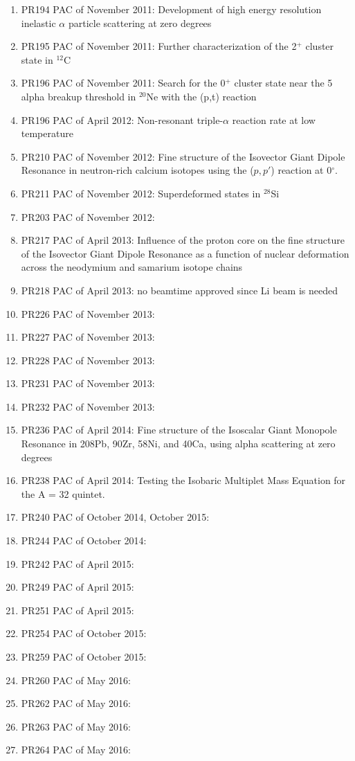 \documentclass[11pt]{report}
\begin{document}
\begin{enumerate}
\item PR194  PAC of November 2011: Development of high energy resolution inelastic $\alpha$ particle scattering at zero degrees	
\item PR195  PAC of November 2011: Further characterization of the 2$^+$ cluster state in $^{12}$C
\item PR196  PAC of November 2011: Search for the 0$^+$ cluster state near the 5 alpha breakup threshold in $^{20}$Ne with the (p,t) reaction
\item PR196  PAC of April 2012: Non-resonant triple-$\alpha$ reaction rate at low temperature
\item PR210  PAC of November 2012: Fine structure of the Isovector Giant Dipole Resonance in neutron-rich calcium isotopes using the ($p,p'$) reaction at 0$^{\circ}$.
\item PR211  PAC of November 2012: Superdeformed states in $^{28}$Si 
\item PR203  PAC of November 2012:
\item PR217  PAC of April 2013: Influence of the proton core on the ﬁne structure of the Isovector
Giant Dipole Resonance as a function of nuclear deformation across the neodymium and samarium isotope chains
\item PR218  PAC of April 2013: no beamtime approved since Li beam is needed
\item PR226  PAC of November 2013: 
\item PR227  PAC of November 2013: 
\item PR228  PAC of November 2013:
\item PR231  PAC of November 2013: 
\item PR232  PAC of November 2013:
\item PR236  PAC of April 2014:   Fine structure of the Isoscalar Giant Monopole Resonance in 
208Pb, 90Zr, 58Ni, and 40Ca, using alpha scattering at zero degrees
\item PR238  PAC of April 2014:  Testing the Isobaric Multiplet Mass Equation for the A = 32 quintet.
\item PR240  PAC of October 2014, October 2015:
\item PR244  PAC of October 2014:
\item PR242  PAC of April 2015:
\item PR249  PAC of April 2015:
\item PR251  PAC of April 2015:
\item PR254  PAC of October 2015:
\item PR259  PAC of October 2015:
\item PR260  PAC of May 2016:
\item PR262  PAC of May 2016:
\item PR263  PAC of May 2016:
\item PR264  PAC of May 2016:




\end{enumerate}
\end{document}
